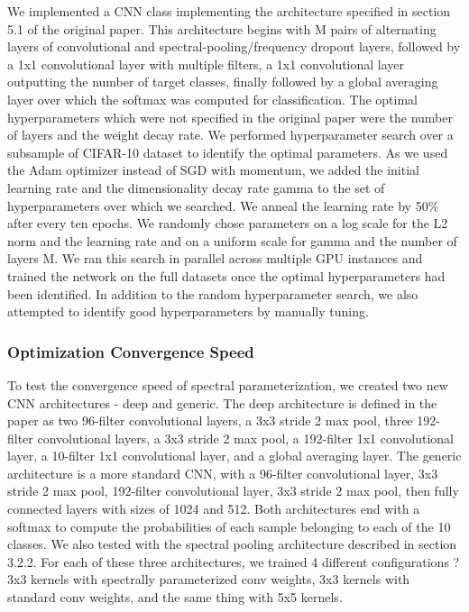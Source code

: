 \documentclass[10pt,journal,compsoc]{IEEEtran}
\begin{document}
We implemented a CNN class implementing the architecture specified in section 5.1 of the original paper. This architecture begins with M pairs of alternating layers of convolutional and spectral-pooling/frequency dropout layers, followed by a 1x1 convolutional layer with multiple filters, a 1x1 convolutional layer outputting the number of target classes, finally followed by a global averaging layer over which the softmax was computed for classification. The optimal hyperparameters which were not specified in the original paper were the number of layers and the weight decay rate. We performed hyperparameter search over a subsample of CIFAR-10 dataset to identify the optimal parameters. As we used the Adam optimizer instead of SGD with momentum, we added the initial learning rate and the dimensionality decay rate gamma to the set of hyperparameters over which we searched. We anneal the learning rate by 50\% after every ten epochs. We randomly chose parameters on a log scale for the L2 norm and the learning rate and on a uniform scale for gamma and the number of layers M. We ran this search in parallel across multiple GPU instances and trained the network on the full datasets once the optimal hyperparameters had been identified. In addition to the random hyperparameter search, we also attempted to identify good hyperparameters by manually tuning.

\subsubsection{Optimization Convergence Speed}

To test the convergence speed of spectral parameterization, we created two new CNN architectures - deep and generic. The deep architecture is defined in the paper as two 96-filter convolutional layers, a 3x3 stride 2 max pool, three 192-filter convolutional layers, a 3x3 stride 2 max pool, a 192-filter 1x1 convolutional layer, a 10-filter 1x1 convolutional layer, and a global averaging layer. The generic architecture is a more standard CNN, with a 96-filter convolutional layer, 3x3 stride 2 max pool, 192-filter convolutional layer, 3x3 stride 2 max pool, then fully connected layers with sizes of 1024 and 512. Both architectures end with a softmax to compute the probabilities of each sample belonging to each of the 10 classes. We also tested with the spectral pooling architecture described in section 3.2.2. For each of these three architectures, we trained 4 different configurations ? 3x3 kernels with spectrally parameterized conv weights, 3x3 kernels with standard conv weights, and the same thing with 5x5 kernels.
\end{document}

